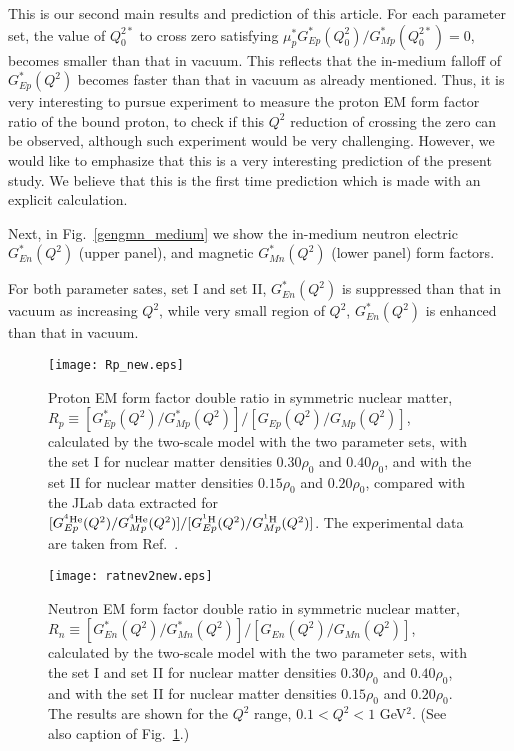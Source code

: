 \documentclass[preprint,aps,showpacs,floatfix]{revtex4}
\begin{document}
This is our second main results and prediction of this article.
For each parameter set, the value of $Q^{2*}_0$ to cross zero satisfying 
$\mu^*_p G^*_{Ep}(Q^2_0)/G^*_{Mp}(Q^{2*}_0) = 0$, becomes smaller than that in vacuum.
This reflects that the in-medium falloff of $G^*_{Ep}(Q^2)$ becomes faster than 
that in vacuum as already mentioned. 
Thus, it is very interesting to pursue experiment to measure 
the proton EM form factor ratio of the bound proton, 
to check if this $Q^2$ reduction of crossing the zero 
can be observed, although such experiment would be very challenging.  
However, we would like to emphasize that this is a very interesting prediction 
of the present study. 
We believe that this is the first time prediction which is made 
with an explicit calculation.  

Next, in Fig.~\ref{gengmn_medium} we show the in-medium neutron electric  
$G^*_{En}(Q^2)$ (upper panel), and magnetic $G^*_{Mn}(Q^2)$ (lower panel) form factors.

For both parameter sates, set I and set II, 
$G^*_{En}(Q^2)$ is suppressed than that in vacuum as increasing $Q^2$, 
while very small region of $Q^2$, $G^*_{En}(Q^2)$ is enhanced than that in vacuum. 


\begin{figure}[hbp]
\vspace*{6ex}
\texttt{[image: Rp\_new.eps]}
%
\caption{Proton EM form factor double ratio in symmetric nuclear matter, 
$R_p \equiv [G^*_{Ep}(Q^2)/G^*_{Mp}(Q^2)]/[G_{Ep}(Q^2)/G_{Mp}(Q^2)]$, 
calculated by the two-scale model with the two parameter sets, with the set I  
for nuclear matter densities $0.30 \rho_0$ and $0.40 \rho_0$, 
and with the set II for nuclear matter densities $0.15 \rho_0$ and $0.20 \rho_0$, 
compared with the JLab data extracted for 
$[G^{^4{\rm He}}_{Ep}(Q^2)/G^{^4{\rm He}}_{Mp}(Q^2)]/[G^{^1{\rm H}}_{Ep}(Q^2)/G^{^1{\rm H}}_{Mp}(Q^2)]$.
The experimental data are taken from Ref.~\cite{Strauch1}.
} 
\label{figratio}
\end{figure}

\begin{figure}[htb]
\texttt{[image: ratnev2new.eps]}
%
\caption{Neutron EM form factor double ratio in symmetric nuclear matter,
$R_n \equiv [G^*_{En}(Q^2)/G^*_{Mn}(Q^2)]/[G_{En}(Q^2)/G_{Mn}(Q^2)]$, 
calculated by the two-scale model with the two parameter sets, with 
the set I and set II for nuclear matter densities $0.30 \rho_0$ and $0.40 \rho_0$, 
and with the set II for nuclear matter densities $0.15 \rho_0$ and $0.20 \rho_0$. 
The results are shown for the $Q^2$ range, $0.1 < Q^2 < 1$ GeV$^2$.  
(See also caption of Fig.~\ref{figratio}.)
} 
\label{fignratio}
\end{figure}
\end{document}
